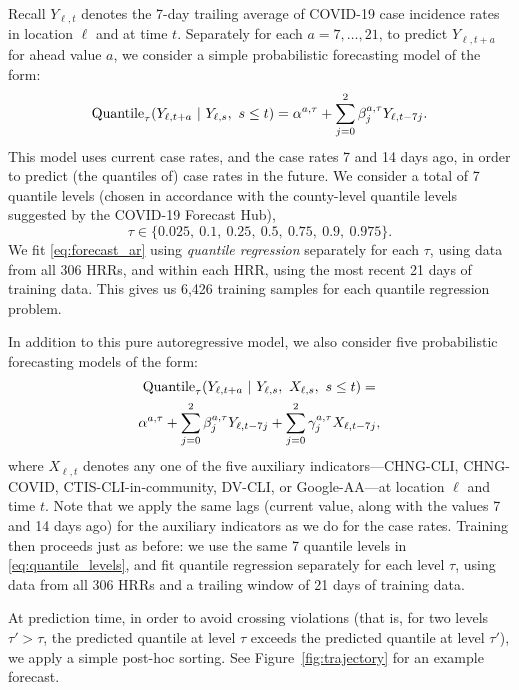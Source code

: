 \documentclass[9pt,twocolumn,twoside,lineno]{pnas-new}
\begin{document}
Recall $Y_{\ell,t}$ denotes the 7-day trailing average of COVID-19 case
incidence rates in location $\ell$ and at time $t$.  Separately for each
$a=7,\ldots,21$, to predict $Y_{\ell,t+a}$ for ahead value $a$, we consider a
simple probabilistic forecasting model of the form:     
\begin{equation}
\label{eq:forecast_ar}
\mathrm{Quantile}_\tau(Y_{\ell,t+a} \ | \ Y_{\ell,s},\ s \leq t)   
= \alpha^{a,\tau} + \sum_{j=0}^2 \beta^{a,\tau}_j Y_{\ell,t-7j}.  
\end{equation}
This model uses current case rates, and the case rates 7 and 14 days ago, in
order to predict (the quantiles of) case rates in the future.  We consider a
total of 7 quantile levels (chosen in accordance with the county-level quantile
levels suggested by the COVID-19 Forecast Hub),      
\begin{equation}
\label{eq:quantile_levels}
\tau \in \{0.025,\ 0.1,\ 0.25,\ 0.5,\ 0.75,\ 0.9,\ 0.975 \}.
\end{equation}
We fit \eqref{eq:forecast_ar} using \textit{quantile regression}
\cite{Koenker:1978, Koenker:2005, Koenker:2006} separately for each $\tau$, 
using data from all 306 HRRs, and within each HRR, using the most recent 21 days
of training data.  This gives us 6,426 training samples for each quantile 
regression problem.    

In addition to this pure autoregressive model, we also consider five
probabilistic forecasting models of the form:  
\begin{multline}
\label{eq:forecast_ar_x}
\mathrm{Quantile}_\tau(Y_{\ell,t+a} \ | \ Y_{\ell,s},\ X_{\ell,s},\ s \leq t) 
= \\ \alpha^{a,\tau} + \sum_{j=0}^2 \beta^{a,\tau}_j Y_{\ell,t-7j} + 
\sum_{j=0}^2 \gamma^{a,\tau}_j X_{\ell,t-7j},
\end{multline}
where $X_{\ell,t}$ denotes any one of the five auxiliary indicators---CHNG-CLI, 
CHNG-COVID, CTIS-CLI-in-community, DV-CLI, or Google-AA---at location $\ell$ and
time $t$. Note that we apply the same lags (current value, along with the values
7 and 14 days ago) for the auxiliary indicators as we do for the case
rates. Training then proceeds just as before: we use the same 7 quantile levels
in \eqref{eq:quantile_levels}, and fit quantile regression separately for each 
level $\tau$, using data from all 306 HRRs and a trailing window of 21 days of
training data.

At prediction time, in order to avoid crossing violations (that is, for two
levels $\tau' > \tau$, the predicted quantile at level $\tau$ exceeds the
predicted quantile at level $\tau'$), we apply a simple post-hoc sorting.  See
Figure~\ref{fig:trajectory} for an example forecast. 
\end{document}
